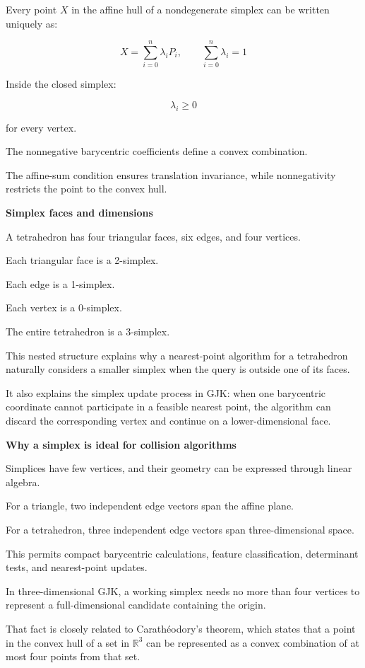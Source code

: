 Every point \(X\) in the affine hull of a nondegenerate simplex can be written uniquely as:

\[
\boxed{ X=\sum_{i=0}^{n}\lambda_iP_i,\qquad \sum_{i=0}^{n}\lambda_i=1 }
\]

Inside the closed simplex:

\[
\lambda_i\ge0
\]

for every vertex.

The nonnegative barycentric coefficients define a convex combination.

The affine-sum condition ensures translation invariance, while nonnegativity restricts the point to the convex hull.

\textbf{Simplex faces and dimensions}

A tetrahedron has four triangular faces, six edges, and four vertices.

Each triangular face is a 2-simplex.

Each edge is a 1-simplex.

Each vertex is a 0-simplex.

The entire tetrahedron is a 3-simplex.

This nested structure explains why a nearest-point algorithm for a tetrahedron naturally considers a smaller simplex when the query is outside one of its faces.

It also explains the simplex update process in GJK: when one barycentric coordinate cannot participate in a feasible nearest point, the algorithm can discard the corresponding vertex and continue on a lower-dimensional face.

\textbf{Why a simplex is ideal for collision algorithms}

Simplices have few vertices, and their geometry can be expressed through linear algebra.

For a triangle, two independent edge vectors span the affine plane.

For a tetrahedron, three independent edge vectors span three-dimensional space.

This permits compact barycentric calculations, feature classification, determinant tests, and nearest-point updates.

In three-dimensional GJK, a working simplex needs no more than four vertices to represent a full-dimensional candidate containing the origin.

That fact is closely related to Carathéodory's theorem, which states that a point in the convex hull of a set in \(\mathbb R^3\) can be represented as a convex combination of at most four points from that set.

